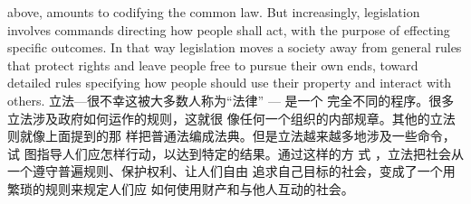 \begin{paracol}{2}
above, amounts to codifying the common law. But increasingly,
legislation involves commands directing how people shall act,
with the purpose of effecting specific outcomes. In that way
legislation moves a society away from general rules that protect
rights and leave people free to pursue their own ends, toward
detailed rules specifying how people should use their property
and interact with others.
\switchcolumn
立法---很不幸这被大多数人称为“法律” --- 是一个
完全不同的程序。很多立法涉及政府如何运作的规则，这就很
像任何一个组织的内部规章。其他的立法则就像上面提到的那
样把普通法编成法典。但是立法越来越多地涉及一些命令，试
图指导人们应怎样行动，以达到特定的结果。通过这样的方
式 ，立法把社会从一个遵守普遍规则、保护权利、让人们自由
追求自己目标的社会，变成了一个用繁琐的规则来规定人们应
如何使用财产和与他人互动的社会。




\end{paracol}

